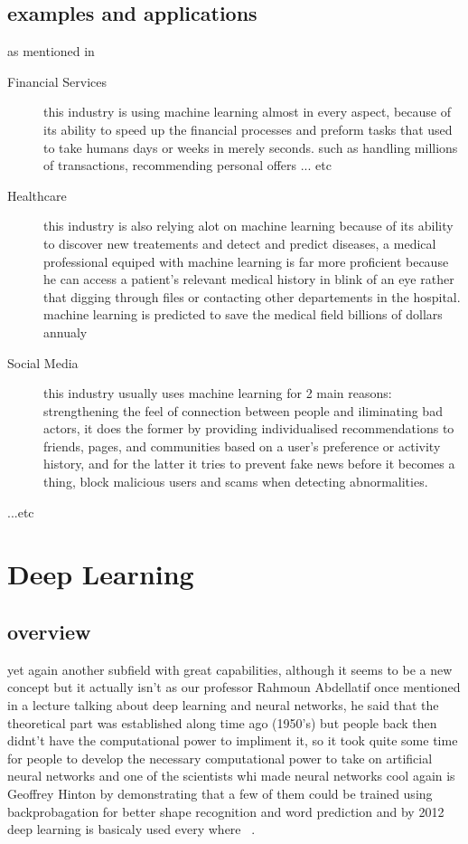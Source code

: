     \subsection{examples and applications}
        as mentioned in ~\cite{ml}
        \begin{description}
        \item [Financial Services]
            this industry is using machine learning almost in every aspect, because of its ability to speed up the financial processes and preform tasks that used to take humans days or weeks in merely seconds. such as handling millions of transactions, recommending personal offers ... etc
        \item [Healthcare]
            this industry is also relying alot on machine learning because of its ability to discover new treatements and detect and predict diseases, a medical professional equiped with machine learning is far more proficient because he can access a patient's relevant medical history in blink of an eye rather that digging through files or contacting other departements in the hospital. machine learning is predicted to save the medical field billions of dollars annualy
        \item [Social Media]
            this industry usually uses machine learning for 2 main reasons: strengthening the feel of connection between people and iliminating bad actors, it does the former by providing individualised recommendations to friends, pages, and communities based on a user's preference or activity history, and for the latter it tries to prevent fake news before it becomes a thing, block malicious users and scams when detecting abnormalities.

        \item [...etc]
        \end{description}

\section{Deep Learning}
    \subsection{overview}
        yet again another subfield with great capabilities, although it seems to be a new concept but it actually isn't as our professor Rahmoun Abdellatif once mentioned in a lecture talking about deep learning and neural networks, he said that the theoretical part was established along time ago (1950's) but people back then didnt't have the computational power to impliment it, so it took quite some time for people to develop the necessary computational power to take on artificial neural networks and one of the scientists whi made neural networks cool again is Geoffrey Hinton by demonstrating that a few of them could be trained using backprobagation for better shape recognition and word prediction and by 2012 deep learning is basicaly used every where ~\cite{dl}.

